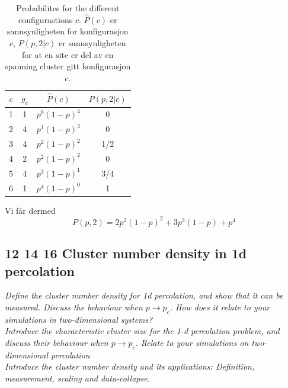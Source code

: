 \documentclass[english, a4paper]{article}
\begin{document}
\begin{table}[H] 
  \begin{center}
    \begin{tabular*}{8cm}{@{\extracolsep{\fill}} cccc}
      \toprule
      $c$ & $g_c$ & $\hat{P}(c)$ & $P(p,2|c)$ \\ 
      \hline
      1 & 1 & $p^0(1-p)^4$ & 0 \\
      2 & 4 & $p^1(1-p)^3$ & 0 \\ 
      3 & 4 & $p^2(1-p)^2$ & 1/2 \\ 
      4 & 2 & $p^2(1-p)^2$ & 0 \\ 
      5 & 4 & $p^3(1-p)^1$ & 3/4 \\
      6 & 1 & $p^4(1-p)^0$ & 1 \\
      \bottomrule
      \end{tabular*} 
    \end{center}
      \caption {Probabilites for the different configurastions $c$. $\hat{P}(c)$ er sannsynligheten
                for konfigurasjon $c$, $P(p,2|c)$ er sannsynligheten for at en site er del av en 
                spanning cluster gitt konfigurasjon $c$.}
  \label{tab:HOEnergies} 
\end{table}
Vi får dermed
\begin{equation}
 P(p,2) = 2p^2(1-p)^2 + 3p^3(1-p) + p^4
\end{equation}

\subsection{12 14 16 Cluster number density in 1d percolation}
\textit{Define the cluster number density for 1d percolation, and show that it can be measured. 
Discuss the behaviour when $p \to p_c$. How does it relate to your simulations in two-dimensional 
systems?} \\
\textit{Introduce the characteristic cluster size for the 1-d percolation problem, and discuss their
behaviour when $p \to p_c$. Relate to your simulations on two-dimensional percolation}\\
\textit{Introduce the cluster number density and its applications: Definition, measurement, scaling
and data-collapse. }\\
\end{document}
